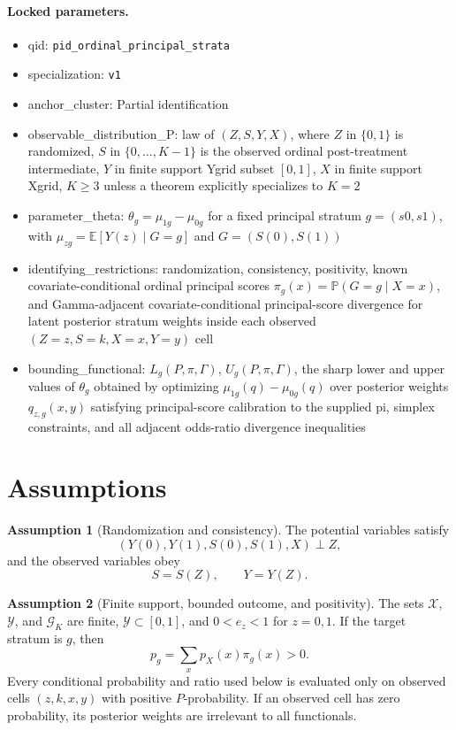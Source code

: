 \documentclass[11pt]{article}
\newcommand{\E}{\mathbb{E}}
\renewcommand{\Pr}{\mathbb{P}}
\theoremstyle{definition}
\newtheorem{assumption}{Assumption}
\theoremstyle{plain}
\theoremstyle{remark}
\begin{document}
\paragraph{Locked parameters.}
\begin{itemize}
  \item qid: \texttt{pid\_ordinal\_principal\_strata}
  \item specialization: \texttt{v1}
  \item anchor\_cluster: Partial identification
  \item observable\_distribution\_P: law of \((Z,S,Y,X)\), where \(Z\) in
  \(\{0,1\}\) is randomized, \(S\) in \(\{0,\ldots,K-1\}\) is the observed
  ordinal post-treatment intermediate, \(Y\) in finite support Ygrid subset
  \([0,1]\), \(X\) in finite support Xgrid, \(K\ge3\) unless a theorem
  explicitly specializes to \(K=2\)
  \item parameter\_theta: \(\theta_g = \mu_{1g} - \mu_{0g}\) for a fixed
  principal stratum \(g=(s0,s1)\), with
  \(\mu_{zg}=\E[Y(z)\mid G=g]\) and \(G=(S(0),S(1))\)
  \item identifying\_restrictions: randomization, consistency, positivity,
  known covariate-conditional ordinal principal scores
  \(\pi_g(x)=\Pr(G=g\mid X=x)\), and Gamma-adjacent covariate-conditional
  principal-score divergence for latent posterior stratum weights inside each
  observed \((Z=z,S=k,X=x,Y=y)\) cell
  \item bounding\_functional: \(L_g(P,\pi,\Gamma)\), \(U_g(P,\pi,\Gamma)\), the
  sharp lower and upper values of \(\theta_g\) obtained by optimizing
  \(\mu_{1g}(q)-\mu_{0g}(q)\) over posterior weights \(q_{z,g}(x,y)\) satisfying
  principal-score calibration to the supplied pi, simplex constraints, and all
  adjacent odds-ratio divergence inequalities
\end{itemize}

\section{Assumptions}
\label{sec:assumptions}
\begin{assumption}[Randomization and consistency]\label{ass:randomization}
The potential variables satisfy
\[
  (Y(0),Y(1),S(0),S(1),X)\perp Z,
\]
and the observed variables obey
\[
  S=S(Z),\qquad Y=Y(Z).
\]
\end{assumption}

\begin{assumption}[Finite support, bounded outcome, and positivity]\label{ass:positivity}
The sets \(\mathcal X\), \(\mathcal Y\), and \(\mathcal G_K\) are finite,
\(\mathcal Y\subset[0,1]\), and \(0<e_z<1\) for \(z=0,1\).  If the target
stratum is \(g\), then
\[
  p_g=\sum_x p_X(x)\pi_g(x)>0.
\]
Every conditional probability and ratio used below is evaluated only on
observed cells \((z,k,x,y)\) with positive \(P\)-probability.  If an observed
cell has zero probability, its posterior weights are irrelevant to all
functionals.
\end{assumption}
\end{document}
